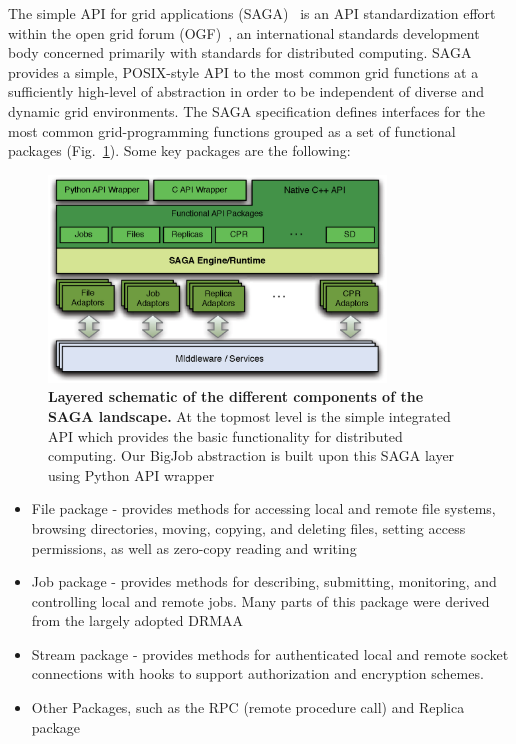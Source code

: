 \documentclass[preprint,12pt]{elsarticle}
\begin{document}
The simple API for grid applications (SAGA)~\cite{saga_web} is an API standardization effort within the open grid forum (OGF)~\cite{ogf_web}, an international standards development body concerned primarily with standards for distributed computing. SAGA provides a simple, POSIX-style API to the most common grid functions at a sufficiently high-level of abstraction in order to be independent of diverse and dynamic grid environments. The SAGA specification defines interfaces for the most common grid-programming functions grouped as a set of functional packages (Fig.~\ref{Fig:SAGA1}). Some key packages are the following:

\begin{figure}
 \begin{center}
     \includegraphics[width=0.8\textwidth]{Structure_of_SAGA.eps}
 \end{center}
\caption{\small {\bf Layered schematic of the different components of the SAGA landscape.} At the topmost level is the simple integrated API which provides the basic functionality for distributed computing. Our BigJob abstraction is built upon this SAGA layer using Python API wrapper}
 \label{Fig:SAGA1}
 \vspace{-1em}
\end{figure}

\begin{itemize}
\item File package - provides methods for accessing local and remote file systems, browsing directories, moving, copying, and deleting files, setting access permissions, as well as zero-copy reading and writing
\item Job package - provides methods for describing, submitting, monitoring, and controlling local and remote jobs. Many parts of this package were derived from the largely adopted DRMAA %
\item Stream package - provides methods for authenticated local and remote socket connections with hooks to support authorization and encryption schemes.
\item Other Packages, such as the RPC (remote procedure call) and Replica package
\end{itemize}
\end{document}
